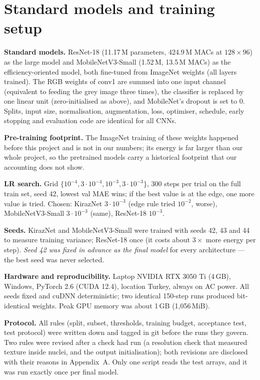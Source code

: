 \documentclass[11pt,a4paper]{article}
\newcommand{\kn}{KirazNet}
\begin{document}
\section{Standard models and training setup}\label{sec:training}

\textbf{Standard models.} ResNet-18 (11.17\,M parameters, 424.9\,M MACs at $128\times96$) as the large
model and MobileNetV3-Small (1.52\,M, 13.5\,M MACs) as the efficiency-oriented model, both fine-tuned
from ImageNet weights (all layers trained). The RGB weights of conv1 are summed into one input channel
(equivalent to feeding the grey image three times), the classifier is replaced by one linear unit
(zero-initialised as above), and MobileNet's dropout is set to 0. Splits, input size, normalisation,
augmentation, loss, optimiser, schedule, early stopping and evaluation code are identical for all CNNs.

\textbf{Pre-training footprint.} The ImageNet training of these weights happened before this project and
is not in our numbers; its energy is far larger than our whole project, so the pretrained models carry a
historical footprint that our accounting does not show.

\textbf{LR search.} Grid $\{10^{-4},3\cdot10^{-4},10^{-3},3\cdot10^{-3}\}$, 300 steps per trial on the
full train set, seed 42, lowest val MAE wins; if the best value is at the edge, one more value is tried.
Chosen: \kn{} $3\cdot10^{-3}$ (edge rule tried $10^{-2}$, worse), MobileNetV3-Small $3\cdot10^{-3}$
(same), ResNet-18 $10^{-3}$.

\textbf{Seeds.} \kn{} and MobileNetV3-Small were trained with seeds 42, 43 and 44 to measure training
variance; ResNet-18 once (it costs about $3\times$ more energy per step). \emph{Seed 42 was fixed in
advance as the final model} for every architecture --- the best seed was never selected.

\textbf{Hardware and reproducibility.} Laptop NVIDIA RTX 3050 Ti (4\,GB), Windows, PyTorch 2.6 (CUDA
12.4), location Turkey, always on AC power. All seeds fixed and cuDNN deterministic; two identical
150-step runs produced bit-identical weights. Peak GPU memory was about 1\,GB (1{,}056\,MiB).

\textbf{Protocol.}\label{sec:protocol} All rules (split, subset, thresholds, training budget, acceptance
test, test protocol) were written down and tagged in git before the runs they govern. Two rules were
revised after a check had run (a resolution check that measured texture inside nuclei, and the output
initialisation); both revisions are disclosed with their reasons in Appendix~A. Only one script reads
the test arrays, and it was run exactly once per final model.
\end{document}
